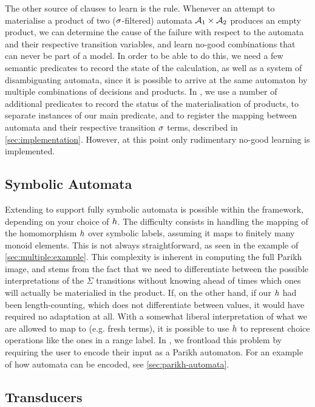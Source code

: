 \documentclass[acmsmall,review,anonymous,screen]{acmart}\settopmatter{printfolios=true,printccs=true,printacmref=true}
\theoremstyle{definition}
\begin{document}
The other source of clauses to learn is the \Materialise{} rule. Whenever an
attempt to materialise a product of two ($\operatorname{\sigma}$-filtered) automata
$\mathcal{A}_1 \times \mathcal{A}_2$ produces an empty product, we can determine
the cause of the failure with respect to the automata and their respective
transition variables, and learn no-good combinations that can never be part of a
model. In order to be able to do this, we need a few semantic predicates to
record the state of the calculation, as well as a system of disambiguating
automata, since it is possible to arrive at the same automaton by multiple
combinations of decisions and products. In \Catra{}, we use a number of
additional predicates to record the status of the materialisation of products,
to separate instances of our main predicate, and to register the mapping between
automata and their respective transition $\operatorname{\sigma}$ terms, described in
\cref{sec:implementation}. However, at this point only rudimentary no-good
learning is implemented.

\subsection{Symbolic Automata}\label{sec:ext:symbolic}

Extending \Calculus{} to support fully symbolic automata is possible within the
framework, depending on your choice of $h$. The difficulty consists in
handling the mapping of the homomorphism $h$ over symbolic labels, assuming
it maps to finitely many monoid elements. This is not always straightforward, as
seen in the example of \cref{sec:multiple:example}. This complexity is inherent
in computing the full Parikh image, and stems from the fact that we need to
differentiate between the possible interpretations of the $\Sigma$ transitions
without knowing ahead of times which ones will actually be materialied in the
product. If, on the other hand, if our $h$ had been length-counting, which
does not differentiate between values, it would have required no adaptation at
all. With a somewhat liberal interpretation of what we are allowed to map to
(e.g. fresh terms), it is possible to use $h$ to represent choice operations
like the ones in a range label. In \Catra{}, we frontload this problem by
requiring the user to encode their input as a Parikh automaton. For an example of how automata can be encoded, see \cref{sec:parikh-automata}.

\subsection{Transducers}\label{sec:ext:transducers}
\end{document}
